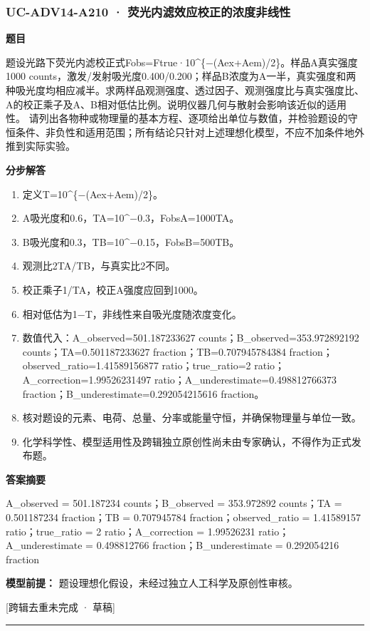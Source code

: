 \documentclass[UTF8,11pt,a4paper]{ctexart}
\begin{document}
\subsubsection*{UC-ADV14-A210 · 荧光内滤效应校正的浓度非线性}
\noindent\textbf{题目}\par
题设光路下荧光内滤校正式Fobs=Ftrue·10\textasciicircum{}\{−(Aex+Aem)/2\}。样品A真实强度1000 counts，激发/发射吸光度0.400/0.200；样品B浓度为A一半，真实强度和两种吸光度均相应减半。求两样品观测强度、透过因子、观测强度比与真实强度比、A的校正乘子及A、B相对低估比例。说明仪器几何与散射会影响该近似的适用性。 请列出各物种或物理量的基本方程、逐项给出单位与数值，并检验题设的守恒条件、非负性和适用范围；所有结论只针对上述理想化模型，不应不加条件地外推到实际实验。\par
\medskip\noindent\textbf{分步解答}
\begin{enumerate}
\item 定义T=10\textasciicircum{}\{−(Aex+Aem)/2\}。
\item A吸光度和0.6，TA=10\textasciicircum{}−0.3，FobsA=1000TA。
\item B吸光度和0.3，TB=10\textasciicircum{}−0.15，FobsB=500TB。
\item 观测比2TA/TB，与真实比2不同。
\item 校正乘子1/TA，校正A强度应回到1000。
\item 相对低估为1−T，非线性来自吸光度随浓度变化。
\item 数值代入：A\_observed=501.187233627 counts；B\_observed=353.972892192 counts；TA=0.501187233627 fraction；TB=0.707945784384 fraction；observed\_ratio=1.41589156877 ratio；true\_ratio=2 ratio；A\_correction=1.99526231497 ratio；A\_underestimate=0.498812766373 fraction；B\_underestimate=0.292054215616 fraction。
\item 核对题设的元素、电荷、总量、分率或能量守恒，并确保物理量与单位一致。
\item 化学科学性、模型适用性及跨辑独立原创性尚未由专家确认，不得作为正式发布题。
\end{enumerate}
\noindent\textbf{答案摘要}\par
A\_observed = 501.187234 counts；B\_observed = 353.972892 counts；TA = 0.501187234 fraction；TB = 0.707945784 fraction；observed\_ratio = 1.41589157 ratio；true\_ratio = 2 ratio；A\_correction = 1.99526231 ratio；A\_underestimate = 0.498812766 fraction；B\_underestimate = 0.292054216 fraction\par
\noindent\textbf{模型前提：}
题设理想化假设，未经过独立人工科学及原创性审核。\par
\noindent\textcolor{red!65!black}{[跨辑去重未完成 · 草稿]} \par
\medskip\hrule\medskip
{}
\end{document}
